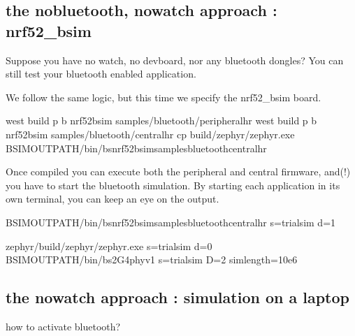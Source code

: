 \documentclass[letterpaper,10pt,english]{sphinxmanual}
\begin{document}
\subsection{the no\sphinxhyphen{}bluetooth, no\sphinxhyphen{}watch approach : nrf52\_bsim}
\label{\detokenize{bluetooth:the-no-bluetooth-no-watch-approach-nrf52-bsim}}
Suppose you have no watch, no devboard, nor any bluetooth dongles?
You can still test your bluetooth enabled application.

We follow the same logic, but this time we specify the nrf52\_bsim board.

\begin{sphinxVerbatim}[commandchars=\\\{\}]
west build \PYGZhy{}p \PYGZhy{}b nrf52\PYGZus{}bsim samples/bluetooth/peripheral\PYGZus{}hr
west build \PYGZhy{}p \PYGZhy{}b nrf52\PYGZus{}bsim samples/bluetooth/central\PYGZus{}hr
cp build/zephyr/zephyr.exe  \PYGZdl{}\PYGZob{}BSIM\PYGZus{}OUT\PYGZus{}PATH\PYGZcb{}/bin/bs\PYGZus{}nrf52\PYGZus{}bsim\PYGZus{}samples\PYGZus{}bluetooth\PYGZus{}central\PYGZus{}hr
\end{sphinxVerbatim}

Once compiled you can execute both the peripheral and central firmware, and(!) you have to start the bluetooth simulation.
By starting each application in its own terminal, you can keep an eye on the output.

\begin{sphinxVerbatim}[commandchars=\\\{\}]
\PYGZdl{}\PYGZob{}BSIM\PYGZus{}OUT\PYGZus{}PATH\PYGZcb{}/bin/bs\PYGZus{}nrf52\PYGZus{}bsim\PYGZus{}samples\PYGZus{}bluetooth\PYGZus{}central\PYGZus{}hr \PYGZhy{}s=trial\PYGZus{}sim \PYGZhy{}d=1

 zephyr/build/zephyr/zephyr.exe \PYGZhy{}s=trial\PYGZus{}sim \PYGZhy{}d=0
 \PYGZdl{}\PYGZob{}BSIM\PYGZus{}OUT\PYGZus{}PATH\PYGZcb{}/bin/bs\PYGZus{}2G4\PYGZus{}phy\PYGZus{}v1 \PYGZhy{}s=trial\PYGZus{}sim \PYGZhy{}D=2 \PYGZhy{}sim\PYGZus{}length=10e6
\end{sphinxVerbatim}


\subsection{the no\sphinxhyphen{}watch approach : simulation on a laptop}
\label{\detokenize{bluetooth:the-no-watch-approach-simulation-on-a-laptop}}
how to activate bluetooth?
\end{document}
